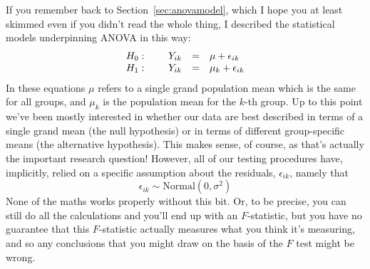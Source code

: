 \vspace{0.2cm}
\begin{mdframed}[style=MyFrame,nobreak=false]
If you remember back to Section~\ref{sec:anovamodel}, which I hope you at least skimmed even if you didn't read the whole thing, I described the statistical models underpinning ANOVA in this way:
$$
\begin{array}{lrcl}
H_0: \hspace*{.5cm} & Y_{ik} &=& \mu + \epsilon_{ik} \\
H_1: & Y_{ik} &=& \mu_k + \epsilon_{ik} 
\end{array}
$$
In these equations $\mu$ refers to a single grand population mean which is the same for all groups, and $\mu_k$ is the population mean for the $k$-th group. Up to this point we've been mostly interested in whether our data are best described in terms of a single grand mean (the null hypothesis) or in terms of different group-specific means (the alternative hypothesis). This makes sense, of course, as that's actually the important research question! However, all of our testing procedures have, implicitly, relied on a specific assumption about the residuals, $\epsilon_{ik}$, namely that
$$
\epsilon_{ik} \sim \mbox{Normal}(0, \sigma^2)
$$
None of the maths works properly without this bit. Or, to be precise, you can still do all the calculations and you'll end up with an $F$-statistic, but you have no guarantee that this $F$-statistic actually measures what you think it's measuring, and so any conclusions that you might draw on the basis of the $F$ test might be wrong. 
\end{mdframed}

